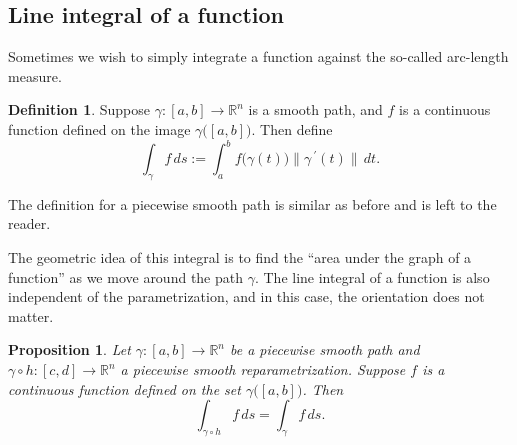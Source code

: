 \documentclass[12pt]{book}
\newcommand{\snorm}[1]{\lVert {#1} \rVert}
\newcommand{\R}{{\mathbb{R}}}
\theoremstyle{plain}
\newtheorem{prop}[thm]{Proposition}
\theoremstyle{remark}
\theoremstyle{definition}
\newtheorem{defn}[thm]{Definition}
\theoremstyle{exercise}
\theoremstyle{example}
\begin{document}


\subsection{Line integral of a function}

Sometimes we wish to simply integrate a function against the so-called
arc-length measure.

\begin{defn}
Suppose $\gamma \colon [a,b] \to \R^n$ is a smooth path, and $f$ is a
continuous function defined on the image $\gamma\bigl([a,b]\bigr)$.  Then
define
\begin{equation*}
\int_{\gamma} f \,ds :=
\int_a^b f\bigl( \gamma(t) \bigr) \snorm{\gamma^{\:\prime}(t)} \, dt .
\end{equation*}

The definition for a piecewise smooth path is similar as before and is left
to the reader.
\end{defn}

The geometric idea of this integral is to find the ``area under the
graph of a function'' as we move around the path $\gamma$.
The line integral of a function is also independent of the parametrization,
and in this case, the orientation does not matter.

\begin{prop} \label{mv:prop:lineintrepararam}
Let $\gamma \colon [a,b] \to \R^n$ be a piecewise smooth path and
$\gamma \circ h \colon [c,d] \to \R^n$ a piecewise smooth reparametrization.
Suppose $f$ is a continuous function defined on the set
$\gamma\bigl([a,b]\bigr)$.  Then
\begin{equation*}
\int_{\gamma \circ h} f\, ds = \int_{\gamma} f\, ds .
\end{equation*}
\end{prop}
\end{document}

